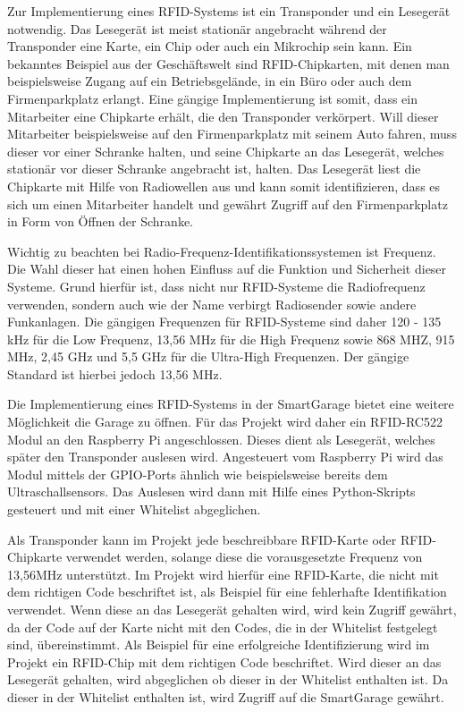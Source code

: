 Zur Implementierung eines RFID-Systems ist ein Transponder und ein Lesegerät notwendig. Das Lesegerät ist meist stationär angebracht während der Transponder eine Karte, ein Chip oder auch ein Mikrochip sein kann.\autocite[Vgl.][S. 33]{rfid} Ein bekanntes Beispiel aus der Geschäftswelt sind RFID-Chipkarten, mit denen man beispielsweise Zugang auf ein Betriebsgelände, in ein Büro oder auch dem Firmenparkplatz erlangt. Eine gängige Implementierung ist somit, dass ein Mitarbeiter eine Chipkarte erhält, die den Transponder verkörpert. Will dieser Mitarbeiter beispielsweise auf den Firmenparkplatz mit seinem Auto fahren, muss dieser vor einer Schranke halten, und seine Chipkarte an das Lesegerät, welches stationär vor dieser Schranke angebracht ist, halten. Das Lesegerät liest die Chipkarte mit Hilfe von Radiowellen aus und kann somit identifizieren, dass es sich um einen Mitarbeiter handelt und gewährt Zugriff auf den Firmenparkplatz in Form von Öffnen der Schranke.

Wichtig zu beachten bei Radio-Frequenz-Identifikationssystemen ist Frequenz. Die Wahl dieser hat einen hohen Einfluss auf die Funktion und Sicherheit dieser Systeme. Grund hierfür ist, dass nicht nur RFID-Systeme die Radiofrequenz verwenden, sondern auch wie der Name verbirgt Radiosender sowie andere Funkanlagen. Die gängigen Frequenzen für RFID-Systeme sind daher 120 - 135 kHz für die Low Frequenz, 13,56 MHz für die High Frequenz sowie 868 MHZ, 915 MHz, 2,45 GHz und 5,5 GHz für die Ultra-High Frequenzen. Der gängige Standard ist hierbei jedoch 13,56 MHz.\autocite[Vgl.][S. 34]{rfid}

Die Implementierung eines RFID-Systems in der SmartGarage bietet eine weitere Möglichkeit die Garage zu öffnen. Für das Projekt wird daher ein RFID-RC522 Modul an den Raspberry Pi angeschlossen. Dieses dient als Lesegerät, welches später den Transponder auslesen wird. Angesteuert vom Raspberry Pi wird das Modul mittels der GPIO-Ports ähnlich wie beispielsweise bereits dem Ultraschallsensors. Das Auslesen wird dann mit Hilfe eines Python-Skripts gesteuert und mit einer Whitelist abgeglichen.

Als Transponder kann im Projekt jede beschreibbare RFID-Karte oder RFID-Chipkarte verwendet werden, solange diese die vorausgesetzte Frequenz von 13,56MHz unterstützt. Im Projekt wird hierfür eine RFID-Karte, die nicht mit dem richtigen Code beschriftet ist, als Beispiel für eine fehlerhafte Identifikation verwendet. Wenn diese an das Lesegerät gehalten wird, wird kein Zugriff gewährt, da der Code auf der Karte nicht mit den Codes, die in der Whitelist festgelegt sind, übereinstimmt. Als Beispiel für eine erfolgreiche Identifizierung wird im Projekt ein RFID-Chip mit dem richtigen Code beschriftet. Wird dieser an das Lesegerät gehalten, wird abgeglichen ob dieser in der Whitelist enthalten ist. Da dieser in der Whitelist enthalten ist, wird Zugriff auf die SmartGarage gewährt.

